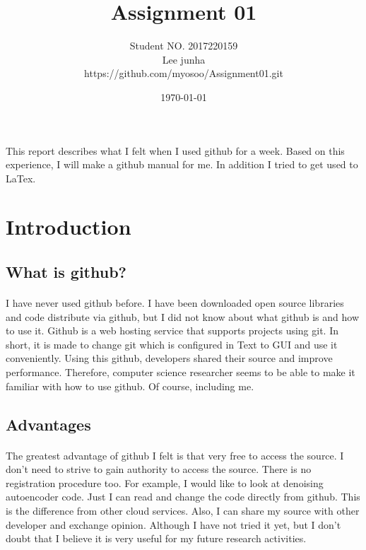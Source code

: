 \documentclass[12pt]{article}%
\begin{document}
\title{Assignment 01}
\author{Student NO. 2017220159\\ Lee junha\\ https://github.com/myosoo/Assignment01.git}
\date{\today}
\maketitle

This report describes what I felt when I used github for a week. Based on this experience, I will make a github manual for me. In addition I tried to get used to LaTex.

\section{Introduction}

\subsection{What is github?}
\paragraph{}
I have never used github before. I have been downloaded open source libraries and code distribute via github, but I did not know about what github is and how to use it. Github is a web hosting service that supports projects using git. In short, it is made to change git which is configured in Text to GUI and use it conveniently. Using this github, developers shared their source and improve performance. Therefore, computer science researcher seems to be able to make it familiar with how to use github. Of course, including me. 

\subsection{Advantages}
\paragraph{}
The greatest advantage of github I felt is that very free to access the source. I don’t need to strive to gain authority to access the source. There is no registration procedure too. For example, I would like to look at denoising autoencoder code. Just I can read and change the code directly from github. This is the difference from other cloud services. Also, I can share my source with other developer and exchange opinion. Although I have not tried it yet, but I don’t doubt that I believe it is very useful for my future research activities.
\end{document}
